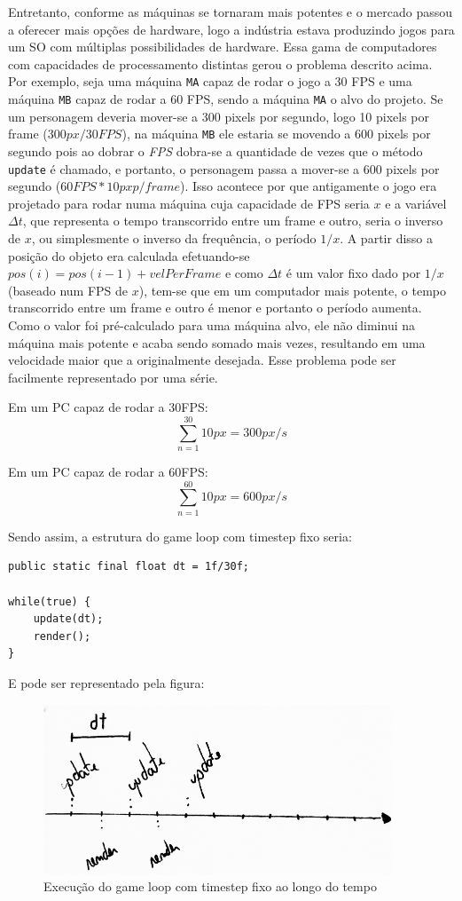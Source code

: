 \documentclass[12pt, 
openright, 
oneside, 
a4paper,    
brazil]{facom-ufu-abntex2}
\begin{document}
Entretanto, conforme as máquinas se tornaram mais potentes e o mercado passou a oferecer mais opções de hardware, logo a indústria estava produzindo jogos para um SO com múltiplas possibilidades de hardware. Essa gama de computadores com capacidades de processamento distintas gerou o problema descrito acima. Por exemplo, seja uma máquina \texttt{MA} capaz de rodar o jogo a 30 FPS e uma máquina \texttt{MB} capaz de rodar a 60 FPS, sendo a máquina \texttt{MA} o alvo do projeto. Se um personagem deveria mover-se a  300 pixels por segundo, logo 10 pixels por frame ($300 px/ 30 FPS$), na máquina \texttt{MB} ele estaria se movendo a 600 pixels por segundo pois ao dobrar o \textit{FPS} dobra-se a quantidade de vezes que o método \texttt{update} é chamado, e portanto, o personagem passa a mover-se a 600 pixels por segundo ($60 FPS * 10 px p/ frame$). Isso acontece por que antigamente o jogo era projetado para rodar numa máquina cuja capacidade de FPS seria $x$ e a variável $\Delta t$, que representa o tempo transcorrido entre um frame e outro, seria o inverso de $x$, ou simplesmente o inverso da frequência, o período $1/x$. A partir disso a posição do objeto era calculada efetuando-se $pos(i) = pos(i-1) + velPerFrame$ e como $\Delta t$ é um valor fixo dado por $1/x$ (baseado num FPS de $x$), tem-se que em um computador mais potente, o tempo transcorrido entre um frame e outro é menor e portanto o período aumenta. Como o valor foi pré-calculado para uma máquina alvo, ele não diminui na máquina mais potente e acaba sendo somado mais vezes, resultando em uma velocidade maior que a originalmente desejada. Esse problema pode ser facilmente representado por uma série.

\noindent
Em um PC capaz de rodar a 30FPS: $$\sum_{n=1}^{30} 10px = 300 px/s$$

\noindent
Em um PC capaz de rodar a 60FPS: $$\sum_{n=1}^{60} 10px = 600 px/s$$

\noindent
Sendo assim, a estrutura do game loop com timestep fixo seria:
\begin{lstlisting}[caption=Game Loop com timestep fixo]
public static final float dt = 1f/30f;

while(true) {
	update(dt);
	render();
}
\end{lstlisting}
E pode ser representado pela figura:
\begin{figure}[H]
	\centering
	\includegraphics[width=28em]{imagens/ilu2_small.png}
	\caption{Execução do game loop com timestep fixo ao longo do tempo}
\end{figure}
\end{document}
